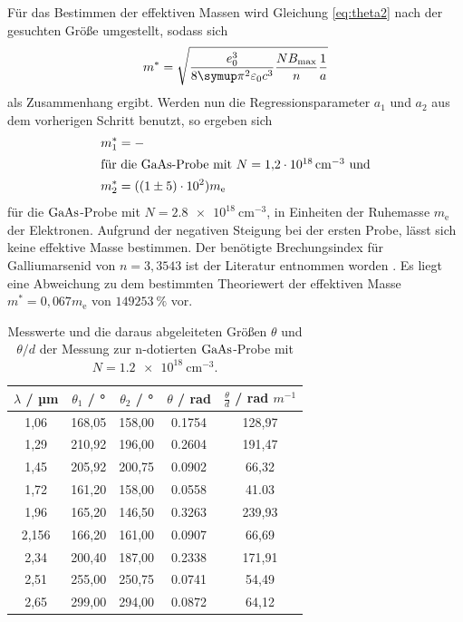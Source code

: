 Für das Bestimmen der effektiven Massen wird Gleichung \ref{eq:theta2} nach der gesuchten Größe umgestellt, sodass sich
\begin{equation}
m^{*} = \sqrt{\frac{e_0^3}{8\pii^2 \varepsilon_0 c^3} \frac{N B_\text{max}}{n} \frac{1}{a}}
\end{equation}
als Zusammenhang ergibt. Werden nun die Regressionsparameter $a_1$ und $a_2$ aus dem vorherigen Schritt benutzt, so ergeben sich
\begin{align*}
  m_1^{*} &= -\\
  \shortintertext{für die $\ce{GaAs}$-Probe mit $N=\SI{1.2e18}{\centi\meter^{-3}}$ und}
  m_2^{*} &= (\num{1 \pm 5e2})m_\text{e}
\end{align*}
für die $\ce{GaAs}$-Probe mit $N=\SI{2.8e18}{\centi\meter^{-3}}$, in Einheiten der Ruhemasse $m_\text{e}$ der Elektronen.
Aufgrund der negativen Steigung bei der ersten Probe, lässt sich keine effektive Masse bestimmen.
Der benötigte Brechungsindex für Galliumarsenid von $n=3,3543$ ist der Literatur entnommen worden \cite{Brechungsindex}.
Es liegt eine Abweichung zu dem bestimmten Theoriewert der effektiven Masse $m^{*}=0,067m_\text{e}$ \cite{effmasse} von $\SI{149253}{\%}$ vor.
\begin{table}[h]
  \centering
  \caption{Messwerte und die daraus abgeleiteten Größen $\theta$ und $\theta/d$ der Messung zur n-dotierten $\ce{GaAs}$-Probe mit $N=\SI{1.2e18}{\centi\meter^{-3}}$.}
  \label{tab:probe1}
  \begin{tabular}{S[table-format=1.1] S S S S}
    {$\lambda$ / µm} & {$\theta_1$ / °} & {$\theta_2$ / °} & {$\theta$ / rad} & {$\frac{\theta}{d}$ / rad $m^{-1}$}\\
    ,06 &  168,05 &  158,00 & 0.1754 & 128,97\\
    1,29 &  210,92 &  196,00 & 0.2604 & 191,47\\
    1,45 &  205,92 &  200,75 & 0.0902 & 66,32\\
    1,72 &  161,20 &  158,00 & 0.0558 & 41.03\\
    1,96 &  165,20 &  146,50 & 0.3263 & 239,93\\
    2,156 & 166,20 &  161,00 & 0.0907 & 66,69\\
    2,34 & 200,40 &  187,00 & 0.2338 & 171,91\\
    2,51 & 255,00 &  250,75 & 0.0741 & 54,49\\
    2,65 & 299,00 &  294,00 & 0.0872 & 64,12\\
  \end{tabular}
\end{table}

